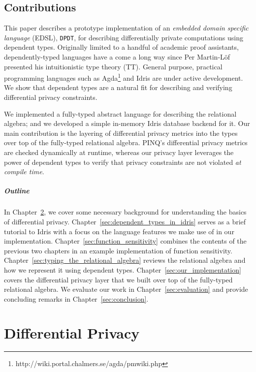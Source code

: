 \documentclass[12pt]{report}
\begin{document}
\section{Contributions}

This paper describes a prototype implementation of an \textit{embedded domain specific language} (EDSL), \texttt{DPDT}, for describing differentially private computations using dependent types.
Originally limited to a handful of academic proof assistants, dependently-typed languages have a come a long way since Per Martin-L\"of presented his intuitionistic type theory (TT)\cite{mlitt}.
General purpose, practical programming languages such as Agda\footnote{http://wiki.portal.chalmers.se/agda/pmwiki.php} and Idris are under active development.
We show that dependent types are a natural fit for describing and verifying differential privacy constraints.

We implemented a fully-typed abstract language for describing the relational algebra; and we developed a simple in-memory Idris database backend for it.
Our main contribution is the layering of differential privacy metrics into the types over top of the fully-typed relational algebra.
PINQ's differential privacy metrics are checked dynamically at runtime, whereas our privacy layer leverages the power of dependent types to verify that privacy constraints are not violated \textit{at compile time}.

\paragraph{Outline}

In Chapter~\ref{sec:differential_privacy}, we cover some necessary background for understanding the basics of differential privacy.
Chapter~\ref{sec:dependent_types_in_idris} serves as a brief tutorial to Idris with a focus on the language features we make use of in our implementation.
Chapter~\ref{sec:function_sensitivity} combines the contents of the previous two chapters in an example implementation of function sensitivity.
Chapter~\ref{sec:typing_the_relational_algebra} reviews the relational algebra and how we represent it using dependent types.
Chapter~\ref{sec:our_implementation} covers the differential privacy layer that we built over top of the fully-typed relational algebra.
We evaluate our work in Chapter~\ref{sec:evaluation} and provide concluding remarks in Chapter~\ref{sec:conclusion}.

\chapter{Differential Privacy}\label{sec:differential_privacy}
\end{document}
